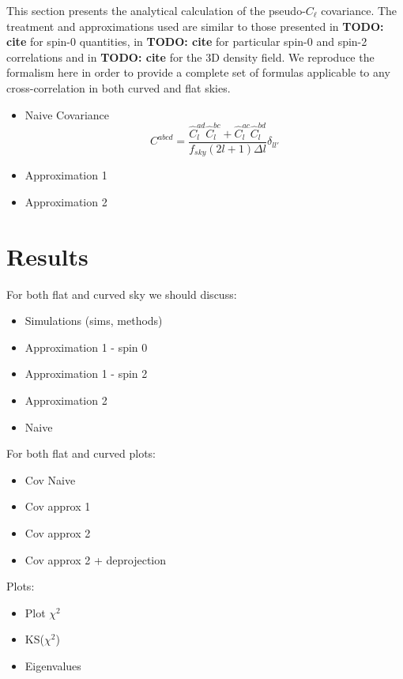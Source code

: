 \documentclass[a4paper,11pt]{article}
\newcommand{\todo}[1]{{\bf TODO: #1}}
\newcommand{\pcl}[3]{\hat C_{#1}^{#2 #3}}
\begin{document}
    

This section presents the analytical calculation of the pseudo-$C_\ell$ covariance. The treatment and approximations used are similar to those presented in \todo{cite} for spin-0 quantities, in \todo{cite} for particular spin-0 and spin-2 correlations and in \todo{cite} for the 3D density field. We reproduce the formalism here in order to provide a complete set of formulas applicable to any cross-correlation in both curved and flat skies.



\begin{itemize}
\item Naive Covariance
  \begin{equation}
    C^{abcd} = \frac{\pcl{l}ad \pcl{l}bc + \pcl{l}ac \pcl{l}bd}{f_{sky} (2l +
      1) \Delta l} \delta_{ll'}
    \label{eq:naive}
  \end{equation}
\item Approximation 1
\item Approximation 2
\end{itemize}



\section{Results}
For both flat and curved sky we should discuss:
\begin{itemize}
\item Simulations (sims, methods)
\item Approximation 1 - spin 0
\item Approximation 1 - spin 2
\item Approximation 2
\item Naive
\end{itemize}

For both flat and curved plots:
\begin{itemize}
\item Cov Naive
\item Cov approx 1
\item Cov approx 2
\item Cov approx 2 + deprojection
\end{itemize}

Plots:
\begin{itemize}
\item Plot $\chi^2$
\item KS($\chi^2$)
\item Eigenvalues
\end{itemize}
\end{document}
